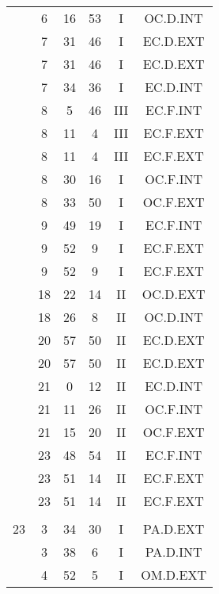 \documentclass[12pt, a4paper]{article}
\begin{document}
\begin{multicols}{3}
{\begin{tabular}{c c c c c c}
	 	 	 	 & 6 & 16 & 53 & I & OC.D.INT\\%
	 	 	 	 & 7 & 31 & 46 & I & EC.D.EXT\\%
	 	 	 	 & 7 & 31 & 46 & I & EC.D.EXT\\%
	 	 	 	 & 7 & 34 & 36 & I & EC.D.INT\\%
	 	 	 	 & 8 & 5 & 46 & III & EC.F.INT\\%
	 	 	 	 & 8 & 11 & 4 & III & EC.F.EXT\\%
	 	 	 	 & 8 & 11 & 4 & III & EC.F.EXT\\%
	 	 	 	 & 8 & 30 & 16 & I & OC.F.INT\\%
	 	 	 	 & 8 & 33 & 50 & I & OC.F.EXT\\%
	 	 	 	 & 9 & 49 & 19 & I & EC.F.INT\\%
	 	 	 	 & 9 & 52 & 9 & I & EC.F.EXT\\%
	 	 	 	 & 9 & 52 & 9 & I & EC.F.EXT\\%
	 	 	 	 & 18 & 22 & 14 & II & OC.D.EXT\\%
	 	 	 	 & 18 & 26 & 8 & II & OC.D.INT\\%
	 	 	 	 & 20 & 57 & 50 & II & EC.D.EXT\\%
	 	 	 	 & 20 & 57 & 50 & II & EC.D.EXT\\%
	 	 	 	 & 21 & 0 & 12 & II & EC.D.INT\\%
	 	 	 	 & 21 & 11 & 26 & II & OC.F.INT\\%
	 	 	 	 & 21 & 15 & 20 & II & OC.F.EXT\\%
	 	 	 	 & 23 & 48 & 54 & II & EC.F.INT\\%
	 	 	 	 & 23 & 51 & 14 & II & EC.F.EXT\\%
	 	 	 	 & 23 & 51 & 14 & II & EC.F.EXT\\%
	 	 	 	 & & & & & \\%
	 	 	 	23 & 3 & 34 & 30 & I & PA.D.EXT\\%
	 	 	 	 & 3 & 38 & 6 & I & PA.D.INT\\%
	 	 	 	 & 4 & 52 & 5 & I & OM.D.EXT\\%
	 	 \end{tabular}
 	}
\end{multicols}
\end{document}
